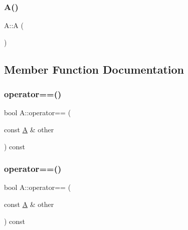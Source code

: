 \mbox{\label{structA_a4142862ec27f2f3d8deb026d51a5c5a0}} 
\subsubsection{\texorpdfstring{A()}{A()}\hspace{0.1cm}{\footnotesize\ttfamily [2/2]}}
{\footnotesize\ttfamily A\+::A (\begin{DoxyParamCaption}{ }\end{DoxyParamCaption})\hspace{0.3cm}{\ttfamily [inline]}}



\subsection{Member Function Documentation}
\mbox{\label{structA_a7d3af89dc96fc459438e3d5c6c57c388}} 
\subsubsection{\texorpdfstring{operator==()}{operator==()}\hspace{0.1cm}{\footnotesize\ttfamily [1/2]}}
{\footnotesize\ttfamily bool A\+::operator== (\begin{DoxyParamCaption}\item[{const \mbox{\hyperlink{structA}{A}} \&}]{other }\end{DoxyParamCaption}) const\hspace{0.3cm}{\ttfamily [inline]}}

\mbox{\label{structA_a7d3af89dc96fc459438e3d5c6c57c388}} 
\subsubsection{\texorpdfstring{operator==()}{operator==()}\hspace{0.1cm}{\footnotesize\ttfamily [2/2]}}
{\footnotesize\ttfamily bool A\+::operator== (\begin{DoxyParamCaption}\item[{const \mbox{\hyperlink{structA}{A}} \&}]{other }\end{DoxyParamCaption}) const\hspace{0.3cm}{\ttfamily [inline]}}



